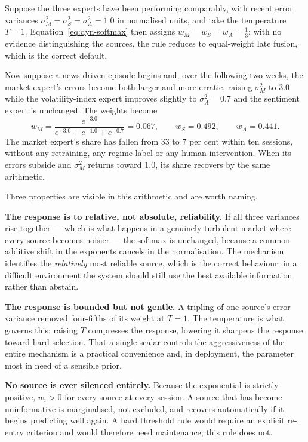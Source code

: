 Suppose the three experts have been performing comparably, with recent error variances
$\sigma_M^2 = \sigma_S^2 = \sigma_A^2 = 1.0$ in normalised units, and take the temperature
$T = 1$. Equation~\eqref{eq:dyn-softmax} then assigns
$w_M = w_S = w_A = \tfrac{1}{3}$: with no evidence distinguishing the sources, the rule reduces to
equal-weight late fusion, which is the correct default.

Now suppose a news-driven episode begins and, over the following two weeks, the market expert's
errors become both larger and more erratic, raising $\sigma_M^2$ to 3.0 while the
volatility-index expert improves slightly to $\sigma_A^2 = 0.7$ and the sentiment expert is
unchanged. The weights become
\[
w_M = \frac{e^{-3.0}}{e^{-3.0} + e^{-1.0} + e^{-0.7}} = 0.067,
\qquad
w_S = 0.492,
\qquad
w_A = 0.441 .
\]
The market expert's share has fallen from 33 to 7 per cent within ten sessions, without any
retraining, any regime label or any human intervention. When its errors subside and
$\sigma_M^2$ returns toward 1.0, its share recovers by the same arithmetic.

Three properties are visible in this arithmetic and are worth naming.

\textbf{The response is to relative, not absolute, reliability.} If all three variances rise
together --- which is what happens in a genuinely turbulent market where every source becomes
noisier --- the softmax is unchanged, because a common additive shift in the exponents cancels in
the normalisation. The mechanism identifies the \emph{relatively} most reliable source, which is
the correct behaviour: in a difficult environment the system should still use the best available
information rather than abstain.

\textbf{The response is bounded but not gentle.} A tripling of one source's error variance
removed four-fifths of its weight at $T = 1$. The temperature is what governs this: raising $T$
compresses the response, lowering it sharpens the response toward hard selection. That a single
scalar controls the aggressiveness of the entire mechanism is a practical convenience and, in
deployment, the parameter most in need of a sensible prior.

\textbf{No source is ever silenced entirely.} Because the exponential is strictly positive,
$w_i > 0$ for every source at every session. A source that has become uninformative is
marginalised, not excluded, and recovers automatically if it begins predicting well again. A
hard threshold rule would require an explicit re-entry criterion and would therefore need
maintenance; this rule does not.

